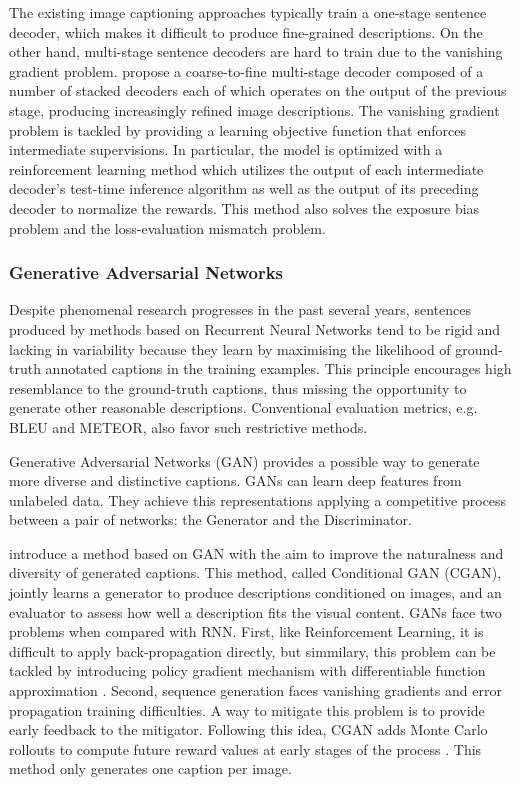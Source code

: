 The existing image captioning approaches typically train a one-stage sentence decoder, which makes it difficult to produce fine-grained descriptions. On the other hand, multi-stage sentence decoders are hard to train due to the vanishing gradient problem. \citet{Gu2018} propose a coarse-to-fine multi-stage decoder composed of a number of stacked decoders each of which operates on the output of the previous stage, producing increasingly refined image descriptions. The vanishing gradient problem is tackled by providing a learning objective function that enforces intermediate supervisions. In particular, the model is optimized with a reinforcement learning method which utilizes the output of each intermediate decoder’s test-time inference algorithm as well as the output of its preceding decoder to normalize the rewards. This method also solves the exposure bias problem and the loss-evaluation mismatch problem.

\subsubsection{Generative Adversarial Networks}

Despite phenomenal research progresses in the past several years, sentences produced by methods based on Recurrent Neural Networks tend to be rigid and lacking in variability because they learn by maximising the likelihood of ground-truth annotated captions in the training examples. This principle encourages high resemblance to the ground-truth captions, thus missing the opportunity to generate other reasonable descriptions. Conventional evaluation metrics, e.g. BLEU and METEOR, also favor such restrictive methods.

Generative Adversarial Networks (GAN) provides a possible way to generate more diverse and distinctive captions. GANs can learn deep features from unlabeled data. They achieve this representations applying a competitive process between a pair of networks: the Generator and the Discriminator. 

\citet{Dai2017_CGAN} introduce a method based on GAN with the aim to improve the naturalness and diversity of generated captions. This method, called Conditional GAN (CGAN), jointly learns a generator to produce descriptions conditioned on images, and an evaluator to assess how well a description fits the visual content. GANs face two problems when compared with RNN. First, like Reinforcement Learning, it is difficult to apply back-propagation directly, but simmilary, this problem can be tackled by introducing policy gradient mechanism with differentiable function approximation \citep{Sutton1999}. Second, sequence generation faces vanishing gradients and error propagation training difficulties. A way to mitigate this problem is to provide early feedback to the mitigator. Following this idea, CGAN adds Monte Carlo rollouts to compute future reward values at early stages of the process \citep{Yu2017}. This method only generates one caption per image.

